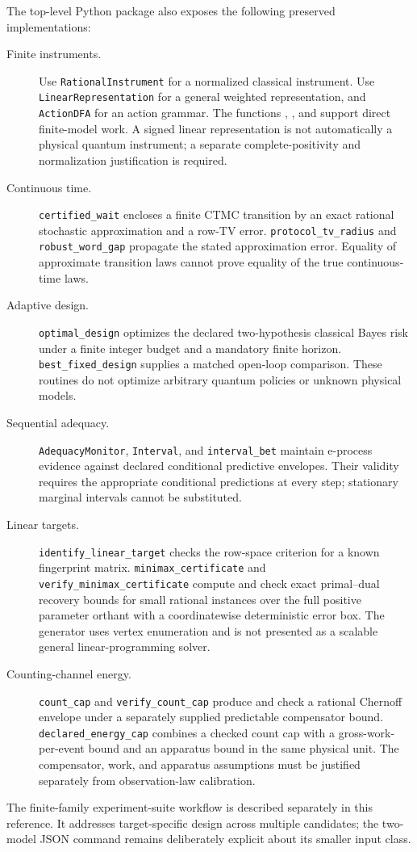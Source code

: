 The top-level Python package also exposes the following preserved
implementations:
\begin{description}
\item[Finite instruments.] Use \texttt{RationalInstrument} for a normalized
classical instrument. Use \texttt{LinearRepresentation} for a general
weighted representation, and \texttt{ActionDFA} for an action grammar.
The functions , , and
 support direct finite-model work. A signed linear
representation is not automatically a physical quantum instrument; a
separate complete-positivity and normalization justification is required.
\item[Continuous time.] \texttt{certified\_wait} encloses a finite CTMC
transition by an exact rational stochastic approximation and a row-TV
error. \texttt{protocol\_tv\_radius} and
\texttt{robust\_word\_gap} propagate the stated approximation error.
Equality of approximate transition laws cannot prove equality of the true
continuous-time laws.
\item[Adaptive design.] \texttt{optimal\_design} optimizes the declared
two-hypothesis classical Bayes risk under a finite integer budget and a
mandatory finite horizon. \texttt{best\_fixed\_design} supplies a matched
open-loop comparison. These routines do not optimize arbitrary quantum
policies or unknown physical models.
\item[Sequential adequacy.] \texttt{AdequacyMonitor},
\texttt{Interval}, and \texttt{interval\_bet} maintain e-process evidence
against declared conditional predictive envelopes. Their validity requires
the appropriate conditional predictions at every step; stationary marginal
intervals cannot be substituted.
\item[Linear targets.] \texttt{identify\_linear\_target} checks the
row-space criterion for a known fingerprint matrix.
\texttt{minimax\_certificate} and
\texttt{verify\_minimax\_certificate} compute and check exact
primal--dual recovery bounds for small rational instances over the full
positive parameter orthant with a coordinatewise deterministic error box.
The generator uses vertex enumeration and is not presented as a scalable
general linear-programming solver.
\item[Counting-channel energy.] \texttt{count\_cap} and
\texttt{verify\_count\_cap} produce and check a rational Chernoff
envelope under a separately supplied predictable compensator bound.
\texttt{declared\_energy\_cap} combines a checked count cap with a
gross-work-per-event bound and an apparatus bound in the same physical
unit. The compensator, work, and apparatus assumptions must be justified
separately from observation-law calibration.
\end{description}
The finite-family experiment-suite workflow is described separately in this
reference. It addresses target-specific design across multiple candidates;
the two-model JSON command remains deliberately explicit about its smaller
input class.

